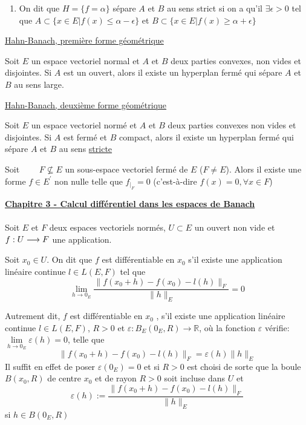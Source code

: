 \documentclass[12pt,a4paper]{article}
\begin{document}
\begin{flushleft}
\begin{mydef}
\begin{enumerate}
\item On dit que $H = \{ f = \alpha \}$ sépare $A$ et $B$ au sens strict si on a qu'il $\exists \epsilon >0$ tel que $ A \subset \{ x \in E | f(x) \leq \alpha - \epsilon \}$ et $B \subset \{ x \in E | f(x) \geq \alpha + \epsilon \}$
\end{enumerate}
\end{mydef}


\underline{Hahn-Banach, première forme géométrique}



\begin{thm}
Soit $E$ un espace vectoriel normal et $A$ et $B$ deux parties convexes, non vides et disjointes. Si $A$ est un ouvert, alors il existe un hyperplan fermé qui sépare $A$ et $B$ au sens large.
\end{thm}

\underline{Hahn-Banach, deuxième forme géométrique}
\begin{thm}
Soit $E$ un espace vectoriel normé et $A$ et $B$ deux parties convexes non vides et disjointes. Si $A$ est fermé et $B$ compact, alors il existe un hyperplan fermé qui sépare $A$ et $B$ au sens \underline{stricte}
\end{thm}

\begin{cor}
Soit $\qquad F \nsubseteq E$ un sous-espace vectoriel fermé de $E$ ($F \neq E$). Alors il existe une forme $f \in E^\prime$ non nulle telle que $f_{|_F} = 0$ (c'est-à-dire $f(x) = 0, \forall x \in F$)
\end{cor}

\textbf{\underline{Chapitre 3 - Calcul différentiel dans les espaces de Banach}}\\~\\

Soit $E$ et $F$ deux espaces vectoriels normés, $U \subset E$ un ouvert non vide et $\textit{$f:U \longrightarrow F$}$ une application.

\begin{mydef}
Soit $x_0 \in U$. On dit que $f$ est différentiable en $x_0$ s'il existe une application linéaire continue $l \in L(E,F)$ tel que  $$ \lim\limits_{h \rightarrow 0_E} \frac{ \lVert f(x_0 + h ) - f(x_0) - l(h) \rVert_F}{ \lVert h  \rVert_E} = 0$$
\end{mydef}

\begin{rem}
Autrement dit, $f$ est différentiable en $x_0$ , s'il existe une application linéaire continue $l \in L(E,F)$, $R > 0$ et $\varepsilon : B_E (0_E, R) \longrightarrow \mathbb{R}$, où la fonction $\varepsilon$ vérifie: $\lim\limits_{h \rightarrow 0_E} \varepsilon (h) = 0$, telle que $$\lVert f(x_0 + h ) - f(x_0) - l(h) \rVert_F =  \varepsilon (h)  \lVert h  \rVert_E$$
Il suffit en effet de poser $\varepsilon (0_E) = 0$ et si $R > 0$ est choisi de sorte que la boule $B(x_0 , R)$ de centre $x_0$ et de rayon $R > 0 $ soit incluse dans $U$ et $$ \varepsilon (h) :=  \frac{ \lVert f(x_0 + h ) - f(x_0) - l(h) \rVert_F}{ \lVert h  \rVert_E}$$
si $h \in B(0_E , R)$
\end{rem}


\end{flushleft}
\end{document}
